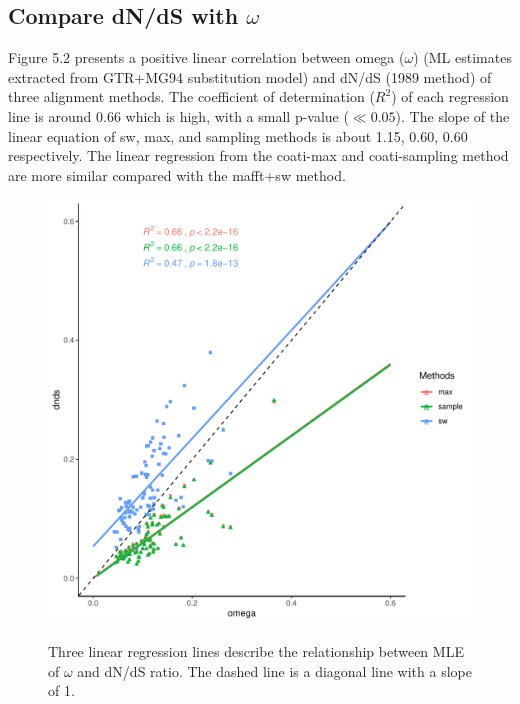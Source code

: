 \subsection{Compare dN/dS with $\omega$ }
Figure 5.2 presents a positive linear correlation between omega ($\omega$) (ML estimates extracted from GTR+MG94 substitution model) and dN/dS (1989 method) of three alignment methods. The coefficient of determination ($R^2$) of each regression line is around 0.66 which is high, with a small p-value ($\ll 0.05$). The slope of the linear equation of sw, max, and sampling methods is about 1.15, 0.60, 0.60 respectively. The linear regression from the coati-max and coati-sampling method are more similar compared with the mafft+sw method.     
\begin{figure}[H]
     \centering
     \begin{minipage}[t]{1\textwidth}
     \includegraphics[width=1\linewidth,height=1\linewidth]{Fig2.pdf}
     { {Three linear regression lines describe the relationship between MLE of $\omega$ and dN/dS ratio. The dashed line is a diagonal line with a slope of 1. }
 \par}
     \end{minipage}
\end{figure}

